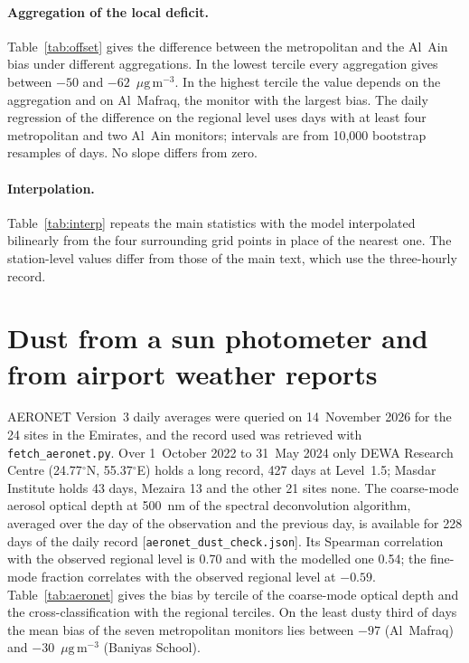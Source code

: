 \documentclass[11pt]{article}
\newcommand*{\ugm}{\ensuremath{\mu\mathrm{g\,m^{-3}}}}
\begin{document}
\paragraph{Aggregation of the local deficit.} Table~\ref{tab:offset} gives the difference between
the metropolitan and the Al~Ain bias under different aggregations. In the lowest tercile every
aggregation gives between $-50$ and $-62$~\ugm{}. In the highest tercile the value depends on
the aggregation and on Al~Mafraq, the monitor with the largest bias. The daily regression of the
difference on the regional level uses days with at least four metropolitan and two Al~Ain
monitors; intervals are from 10,000 bootstrap resamples of days. No slope differs from zero.

\begin{table}[ht]\centering\small
\caption{Metropolitan minus Al~Ain bias (\ugm{}) by tercile of the regional level, under
different aggregations, and its daily regression on the regional level (slope in \ugm{} per
\ugm{} of regional level).}
\label{tab:offset}

\end{table}

\paragraph{Interpolation.} Table~\ref{tab:interp} repeats the main statistics with the model
interpolated bilinearly from the four surrounding grid points in place of the nearest one. The
station-level values differ from those of the main text, which use the three-hourly record.

\begin{table}[ht]\centering\small
\caption{Nearest grid point and bilinear interpolation, daily record. Concentrations and biases
in \ugm{}.}
\label{tab:interp}

\end{table}

\section{Dust from a sun photometer and from airport weather reports}

AERONET Version~3 daily averages were queried on 14~November 2026 for the 24 sites in the
Emirates, and the record used was retrieved with \texttt{fetch\_aeronet.py}. Over 1~October 2022 to 31~May 2024 only DEWA Research
Centre (24.77$^{\circ}$N, 55.37$^{\circ}$E) holds a long record, 427 days at Level~1.5; Masdar
Institute holds 43 days, Mezaira 13 and the other 21 sites none. The coarse-mode aerosol optical
depth at 500~nm of the spectral deconvolution algorithm, averaged over the day of the observation
and the previous day, is available for 228 days of the daily record
[\texttt{aeronet\_dust\_check.json}]. Its Spearman correlation with the observed regional level is
0.70 and with the modelled one 0.54; the fine-mode fraction correlates with the observed regional
level at $-0.59$. Table~\ref{tab:aeronet} gives the bias by tercile of the coarse-mode optical
depth and the cross-classification with the regional terciles. On the least dusty third of days
the mean bias of the seven metropolitan monitors lies between $-97$ (Al~Mafraq) and $-30$~\ugm{}
(Baniyas School).
\end{document}
